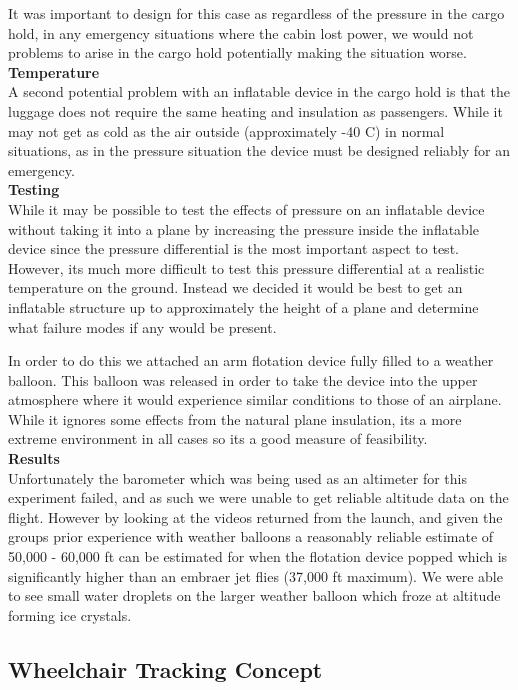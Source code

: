 It was important to design for this case as regardless of the pressure in the cargo hold, in any emergency situations where the cabin lost power, we would not problems to arise in the cargo hold potentially making the situation worse.\\

\noindent\textbf{Temperature}\\
A second potential problem with an inflatable device in the cargo hold is that the luggage does not require the same heating and insulation as passengers. While it may not get as cold as the air outside (approximately -40 C) in normal situations, as in the pressure situation the device must be designed reliably for an emergency. \\

\noindent\textbf{Testing}\\
While it may be possible to test the effects of pressure on an inflatable device without taking it into a plane by increasing the pressure inside the inflatable device since the pressure differential is the most important aspect to test. However, its much more difficult to test this pressure differential at a realistic temperature on the ground. Instead we decided it would be best to get an inflatable structure up to approximately the height of a plane and determine what failure modes if any would be present. 

In order to do this we attached an arm flotation device fully filled to a weather balloon. This balloon was released in order to take the device into the upper atmosphere where it would experience similar conditions to those of an airplane. While it ignores some effects from the natural plane insulation, its a more extreme environment in all cases so its a good measure of feasibility. \\

\noindent\textbf{Results}\\
Unfortunately the barometer which was being used as an altimeter for this experiment failed, and as such we were unable to get reliable altitude data on the flight. However by looking at the videos returned from the launch, and given the groups prior experience with weather balloons a reasonably reliable estimate of 50,000 - 60,000 ft can be estimated for when the flotation device popped which is significantly higher than an embraer jet flies (37,000 ft maximum). We were able to see small water droplets on the larger weather balloon which froze at altitude forming ice crystals.


\subsection{Wheelchair Tracking Concept}

